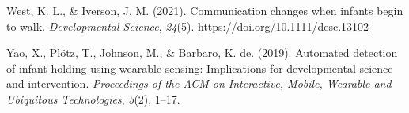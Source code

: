 \documentclass[
  man]{apa6}
\newlength{\cslhangindent}
\newlength{\cslentryspacingunit} %
\newenvironment{CSLReferences}[2] %
 {%
  \setlength{\parindent}{0pt}
  \ifodd #1
  \let\oldpar\par
  \def\par{\hangindent=\cslhangindent\oldpar}
  \fi
  \setlength{\parskip}{#2\cslentryspacingunit}
 }%
 {}
\begin{document}
\begin{CSLReferences}{1}{0}
\leavevmode{}%
West, K. L., \& Iverson, J. M. (2021). Communication changes when infants begin to walk. \emph{Developmental Science}, \emph{24}(5). \url{https://doi.org/10.1111/desc.13102}

\leavevmode{}%
Yao, X., Plötz, T., Johnson, M., \& Barbaro, K. de. (2019). Automated detection of infant holding using wearable sensing: Implications for developmental science and intervention. \emph{Proceedings of the ACM on Interactive, Mobile, Wearable and Ubiquitous Technologies}, \emph{3}(2), 1--17.

\end{CSLReferences}
\end{document}
